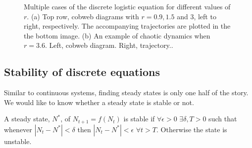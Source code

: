 \begin{figure}[ph!!!tb]
\centering
{}
\caption{Multiple cases of the discrete logistic equation for different values of $r$. (a) Top row, cobweb diagrams with $r=0.9, 1.5$ and 3, left to right, respectively. The accompanying trajectories are plotted in the the bottom image. (b) An example of chaotic dynamics when $r=3.6$. Left, cobweb diagram. Right, trajectory.\label{Logisitic_difference_simulations}.}
\end{figure}

\subsection{Stability of discrete equations}
Similar to continuous systems, finding steady states is only one half of the story. We would like to know whether a steady state is stable or not.
\begin{defin}
A steady state, $N^*$, of $N_{t+1}=f(N_t)$ is stable if $\forall \epsilon>0$ $\exists \delta, T>0$ such that whenever $|N_t-N^*|<\delta$ then $|N_t-N^*|<\epsilon$ $\forall t>T$. Otherwise the state is unstable.
\end{defin}

